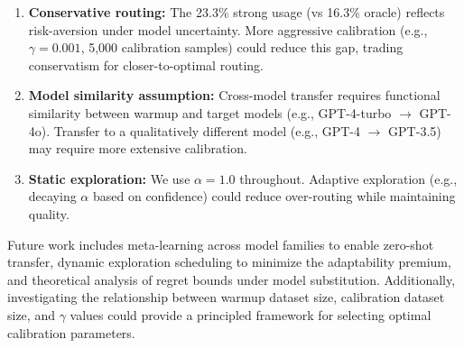 \begin{enumerate}
    \item \textbf{Conservative routing:} The 23.3\% strong usage (vs 16.3\% oracle) reflects risk-aversion under model uncertainty. More aggressive calibration (e.g., $\gamma = 0.001$, 5,000 calibration samples) could reduce this gap, trading conservatism for closer-to-optimal routing.
    
    \item \textbf{Model similarity assumption:} Cross-model transfer requires functional similarity between warmup and target models (e.g., GPT-4-turbo $\to$ GPT-4o). Transfer to a qualitatively different model (e.g., GPT-4 $\to$ GPT-3.5) may require more extensive calibration.
    
    \item \textbf{Static exploration:} We use $\alpha = 1.0$ throughout. Adaptive exploration (e.g., decaying $\alpha$ based on confidence) could reduce over-routing while maintaining quality.
\end{enumerate}

Future work includes meta-learning across model families to enable zero-shot transfer, dynamic exploration scheduling to minimize the adaptability premium, and theoretical analysis of regret bounds under model substitution. Additionally, investigating the relationship between warmup dataset size, calibration dataset size, and $\gamma$ values could provide a principled framework for selecting optimal calibration parameters.
